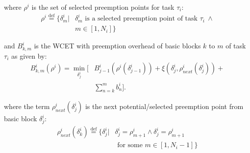 \noindent
where \begin{math}\rho^{i}\end{math} is the set of selected preemption points for task \begin{math}\tau_{i}\end{math}:
\begin{equation}\label{eqn:pp-set}
\begin{split}
   \rho^{i} \stackrel{\text{def}}{=} \{\delta_{m}^{i}|&\delta_{m}^{i} \text{ is a selected preemption point of task } \tau_{i}\ \wedge \\ &m \in [1,N_{i}]\}
\end{split}
\end{equation}

\noindent
and \begin{math}B_{k,m}^{i}\end{math} is the WCET with preemption overhead of basic blocks $k$ to $m$ of task \begin{math}\tau_{i}\end{math} as given by:
\begin{equation}\label{eqn:bbkwcet-cost}
\begin{split}
   B_{k,m}^{i}(\rho^{i}) = \min_{\delta_{j}^{i}} \Big[&B_{j-1}^{i}(\rho^{i}(\delta_{j-1}^{i})) + \xi(\delta_{j}^{i},\rho_{next}^{i}(\delta_{j}^{i})) + \\ &\sum_{n=k}^{m}b_{n}^{i}\Big].
\end{split}
\end{equation}

\noindent
where the term \begin{math}\rho_{next}^{i}(\delta_{j}^{i})\end{math} is the next potential/selected preemption point from basic block \begin{math}\delta_{j}^{i}\end{math}:
\begin{equation}\label{eqn:ppnext-set}
\begin{split}
   \rho_{next}^{i}(\delta_{k}^{i}) \stackrel{\text{def}}{=} \{\delta_{j}^{i}|&\delta_{j}^{i} = \rho_{m+1}^{i} \wedge \delta_{j}^{i} = \rho_{m+1}^{i} \\ &\textrm{ for some } m \in [1,N_{i}-1]\}
\end{split}
\end{equation}


